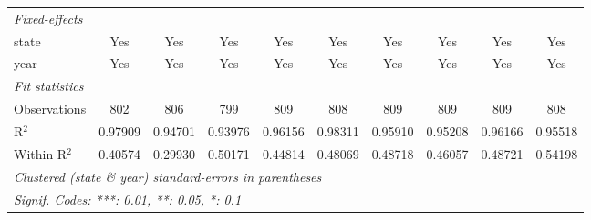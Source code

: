 \documentclass{article}
\begin{document}
\begin{landscape}
\begin{longtable}{@{\extracolsep{5pt}}lccccccccc}
   \midrule
   \emph{Fixed-effects}\\
   state                & Yes                           & Yes                     & Yes                           & Yes                          & Yes                         & Yes                          & Yes                     & Yes                           & Yes\\  
   year                 & Yes                           & Yes                     & Yes                           & Yes                          & Yes                         & Yes                          & Yes                     & Yes                           & Yes\\  
   \midrule
   \emph{Fit statistics}\\
   Observations         & 802                           & 806                     & 799                           & 809                          & 808                         & 809                          & 809                     & 809                           & 808\\  
   R$^2$                & 0.97909                       & 0.94701                 & 0.93976                       & 0.96156                      & 0.98311                     & 0.95910                      & 0.95208                 & 0.96166                       & 0.95518\\  
   Within R$^2$         & 0.40574                       & 0.29930                 & 0.50171                       & 0.44814                      & 0.48069                     & 0.48718                      & 0.46057                 & 0.48721                       & 0.54198$$\\  
   \midrule \midrule
   \multicolumn{10}{l}{\emph{Clustered (state \& year) standard-errors in parentheses}}\\
   \multicolumn{10}{l}{\emph{Signif. Codes: ***: 0.01, **: 0.05, *: 0.1}}\\
\end{longtable}
\end{landscape}
\restoregeometry
\normalsize
\end{document}

